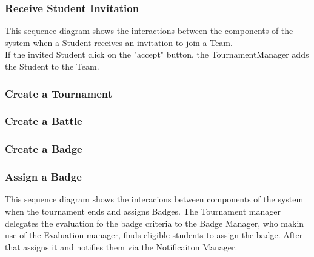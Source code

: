 \begin{landscape}
\clearpage
\subsubsection{Receive Student Invitation}
This sequence diagram shows the interactions between the components of the system when a Student receives an invitation to join a Team.\\
If the invited Student click on the "accept" button, the TournamentManager adds the Student to the Team.\\

\clearpage
\subsubsection{Create a Tournament}

\clearpage
\subsubsection{Create a Battle}


\clearpage
\subsubsection{Create a Badge}

\clearpage
\subsubsection{Assign a Badge}
This sequence diagram shows the interacions between components of the system when the tournament ends and assigns Badges.
The Tournament manager delegates the evaluation fo the badge criteria to the Badge Manager, who makin use of the Evaluation manager, finds eligible students to assign the badge.
After that assigns it and notifies them via the Notificaiton Manager.


\end{landscape}
